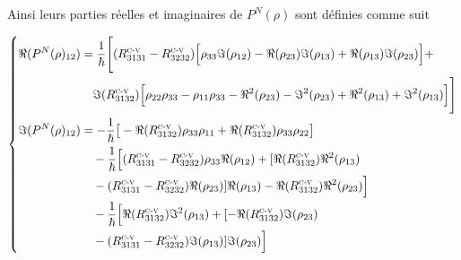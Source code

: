 \documentclass[12pt,a4paper,openany,oneside]{book}
\begin{document}
{{{{{{Ainsi leurs parties réelles et imaginaires de $  P^{N}(\rho) $ sont définies comme suit
 
\begin{eqnarray*}
\left\{
\begin{split}
\Re(P^{N}(\rho)_{12}) &= \dfrac{1}{\hbar}\Bigg[ (R^{\textsc{c-v}}_{3131}-R^{\textsc{c-v}}_{3232})\Big[\rho_{33}\Im(\rho_{12})-\Re(\rho_{23})\Im(\rho_{13})+\Re(\rho_{13})\Im(\rho_{23})\Big] + \\
&\quad \Im(R^{\textsc{c-v}}_{3132})\Big[\rho_{22}\rho_{33}-\rho_{11}\rho_{33}-\Re^{2}(\rho_{23})-\Im^{2}(\rho_{23})+\Re^{2}(\rho_{13})+\Im^{2}(\rho_{13})\Big]\Bigg]\\
\Im(P^{N}(\rho)_{12})&=  -\dfrac{1}{\hbar}\big[-\Re(R^{\textsc{c-v}}_{3132})\rho_{33}\rho_{11}+\Re(R^{\textsc{c-v}}_{3132})\rho_{33}\rho_{22}\big]\\
&\quad -\dfrac{1}{\hbar}\Big[(R^{\textsc{c-v}}_{3131}-R^{\textsc{c-v}}_{3232})\rho_{33}\Re(\rho_{12})+[\Re(R^{\textsc{c-v}}_{3132})\Re^{2}(\rho_{13})\\
&\quad -(R^{\textsc{c-v}}_{3131}-R^{\textsc{c-v}}_{3232})\Re(\rho_{23})]\Re(\rho_{13})- \Re(R^{\textsc{c-v}}_{3132})\Re^{2}(\rho_{23})\Big]\\
&\quad -\dfrac{1}{\hbar}\Big[\Re(R^{\textsc{c-v}}_{3132})\Im^{2}(\rho_{13})+[-\Re(R^{\textsc{c-v}}_{3132})\Im(\rho_{23})\\
&\quad -(R^{\textsc{c-v}}_{3131}-R^{\textsc{c-v}}_{3232})\Im(\rho_{13})]\Im(\rho_{23})\Big]
\end{split}
\right.
\end{eqnarray*}

}}}}}}
\end{document}
